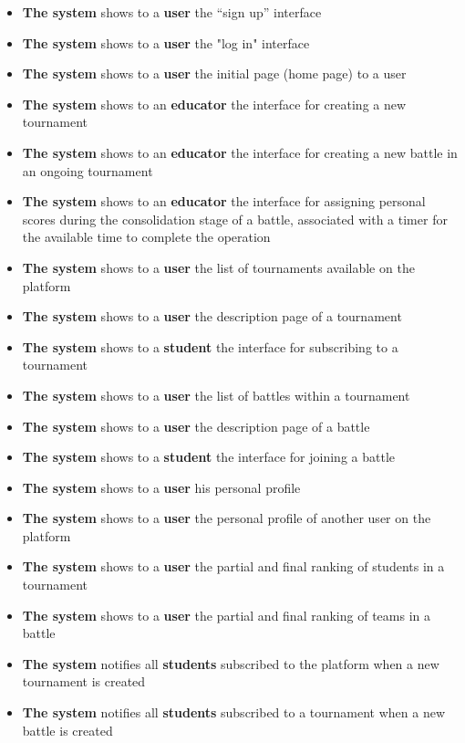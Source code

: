 	\begin{itemize}
		\item \textbf{The system} shows to a \textbf{user} the “sign up” interface
		\item \textbf{The system} shows to a \textbf{user} the "log in" interface
		\item \textbf{The system} shows to a \textbf{user} the initial page (home page) to a user
		\item \textbf{The system} shows to an \textbf{educator} the interface for creating a new tournament
		\item \textbf{The system} shows to an \textbf{educator} the interface for creating a new battle in an ongoing tournament
		\item \textbf{The system} shows to an \textbf{educator} the interface for assigning personal scores during the consolidation stage of a battle, associated with a timer for the available time to complete the operation
		\item \textbf{The system} shows to a \textbf{user} the list of tournaments available on the platform
		\item \textbf{The system} shows to a \textbf{user} the description page of a tournament
		\item \textbf{The system} shows to a \textbf{student} the interface for subscribing to a tournament
		\item \textbf{The system} shows to a \textbf{user} the list of battles within a tournament
		\item \textbf{The system} shows to a \textbf{user} the description page of a battle
		\item \textbf{The system} shows to a \textbf{student} the interface for joining a battle
		\item \textbf{The system} shows to a \textbf{user} his personal profile
		\item \textbf{The system} shows to a \textbf{user} the personal profile of another user on the platform
		\item \textbf{The system} shows to a \textbf{user} the partial and final ranking of students in a tournament
		\item \textbf{The system} shows to a \textbf{user} the partial and final ranking of teams in a battle
		\item \textbf{The system} notifies all \textbf{students} subscribed to the platform when a new tournament is created
		\item \textbf{The system} notifies all \textbf{students} subscribed to a tournament when a new battle is created

\end{itemize}
